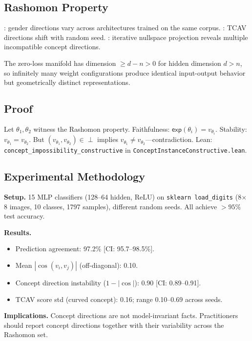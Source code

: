 \documentclass{article}
\newcommand{\incomp}{\perp}
\begin{document}
\subsection{Rashomon Property}

\citet{bolukbasi2016man}: gender directions vary across architectures trained on the same corpus.
\citet{kim2018tcav}: TCAV directions shift with random seed.
\citet{ravfogel2020null}: iterative nullspace projection reveals multiple incompatible concept directions.

The zero-loss manifold has dimension $\geq d - n > 0$ for hidden dimension $d > n$, so infinitely many weight configurations produce identical input-output behavior but geometrically distinct representations.

\subsection{Proof}

Let $\theta_1, \theta_2$ witness the Rashomon property.  Faithfulness: $\mathsf{exp}(\theta_i) = v_{\theta_i}$.  Stability: $v_{\theta_1} = v_{\theta_2}$.  But $(v_{\theta_1}, v_{\theta_2}) \in \incomp$ implies $v_{\theta_1} \neq v_{\theta_2}$---contradiction.  Lean: \texttt{concept\_impossibility\_constructive} in \texttt{ConceptInstanceConstructive.lean}.

\subsection{Experimental Methodology}

\textbf{Setup.}  15 MLP classifiers (128--64 hidden, ReLU) on \texttt{sklearn load\_digits} (8$\times$8 images, 10 classes, 1797 samples), different random seeds.  All achieve $> 95\%$ test accuracy.

\textbf{Results.}
\begin{itemize}
  \item Prediction agreement: 97.2\% [CI: 95.7--98.5\%].
  \item Mean $|\cos(v_i, v_j)|$ (off-diagonal): 0.10.
  \item Concept direction instability ($1 - |\cos|$): 0.90 [CI: 0.89--0.91].
  \item TCAV score std (curved concept): 0.16; range 0.10--0.69 across seeds.
\end{itemize}

\textbf{Implications.}  Concept directions are not model-invariant facts.  Practitioners should report concept directions together with their variability across the Rashomon set.
\end{document}
